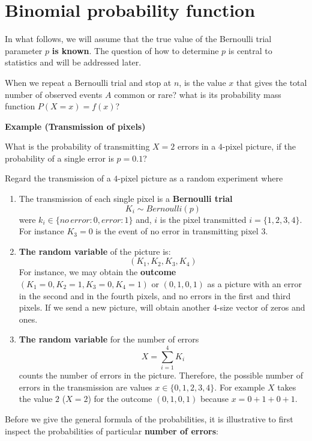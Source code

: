 \documentclass[
]{book}
\begin{document}
\hypertarget{binomial-probability-function}{%
\section{Binomial probability function}\label{binomial-probability-function}}

In what follows, we will assume that the true value of the Bernoulli trial parameter \(p\) \textbf{is known}. The question of how to determine \(p\) is central to statistics and will be addressed later.

When we repeat a Bernoulli trial and stop at \(n\), is the value \(x\) that gives the total number of observed events \(A\) common or rare? what is its probability mass function \(P(X=x)=f(x)\)?

\textbf{Example (Transmission of pixels)}

What is the probability of transmitting \(X=2\) errors in a \(4\)-pixel picture, if the probability of a single error is \(p=0.1\)?

Regard the transmission of a \(4\)-pixel picture as a random experiment where

\begin{enumerate}
\def\labelenumi{\arabic{enumi})}
\item
  The transmission of each single pixel is a \textbf{Bernoulli trial} \[K_i \sim Bernoulli(p)\] were \(k_i \in \{no\,error:0, error:1\}\) and, \(i\) is the pixel transmitted \(i=\{1,2,3,4\}\). For instance \(K_3=0\) is the event of no error in transmitting pixel \(3\).
\item
  \textbf{The random variable} of the picture is: \[(K_1, K_2, K_3, K_4)\] For instance, we may obtain the \textbf{outcome} \((K_1=0, K_2=1, K_3=0, K_4=1)\) or \((0, 1, 0, 1)\) as a picture with an error in the second and in the fourth pixels, and no errors in the first and third pixels. If we send a new picture, will obtain another 4-size vector of zeros and ones.
\item
  \textbf{The random variable} for the number of errors \[X=\sum_{i=1}^4 K_i\]
  counts the number of errors in the picture.
  Therefore, the possible number of errors in the transmission are values \(x\in \{0,1,2,3,4\}\). For example \(X\) takes the value \(2\) (\(X=2\)) for the outcome \((0, 1, 0, 1)\) because \(x=0+1+0+1\).
\end{enumerate}

Before we give the general formula of the probabilities, it is illustrative to first inspect the probabilities of particular \textbf{number of errors}:
\end{document}
